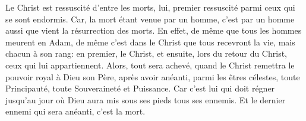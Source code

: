 Le Christ est ressuscité d’entre les morts,
	lui, premier ressuscité parmi ceux qui se sont endormis.
Car, la mort étant venue par un homme,
	c’est par un homme aussi que vient la résurrection des morts.
En effet, de même que tous les hommes meurent en Adam,
	de même c’est dans le Christ que tous recevront la vie,
		mais chacun à son rang:
	en premier, le Christ,
	et ensuite, lors du retour du Christ, ceux qui lui appartiennent.
Alors, tout sera achevé,
	quand le Christ remettra le pouvoir royal à Dieu son Père,
	après avoir anéanti, parmi les êtres célestes,
	toute Principauté, toute Souveraineté et Puissance.
Car c’est lui qui doit régner
	jusqu’au jour où Dieu aura mis sous ses pieds tous ses ennemis.
Et le dernier ennemi qui sera anéanti, c’est la mort.
